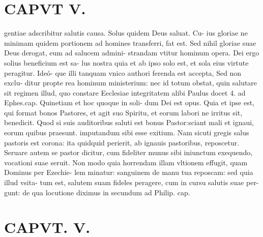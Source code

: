 \documentclass{article}
\begin{document}
\begin{pages}
\section*{CAPVT V. }
\marginpar{[ p.55 ]}\pstart gentiae adscribitur salutis causa. Solus quidem Deus saluat. Cu- ius gloriae ne minimam quidem portionem ad homines transferri, fat est. Sed nihil gloriae suae Deus derogat, eum ad salucem admini- strandam vtitur hominum opera. Dei ergo solius beneficium est sa- lus nostra quia et ab ipso solo est, et sola eius virtute peragitur. Ideó- que illi tanquam vnico authori ferenda est accepta, Sed non exclu- ditur propte rea hominum ministerium: nec id totum obstat, quin salutare sit regimen illud, quo constare Eeclesiae integritatem alibi Paulus docet 4. ad Ephes.cap. Quinetiam et hoc quoque in soli- dum Dei est opus. Quia et ipse est, qui format bonos Pastores, et agit suo Spiritu, et eorum labori ne irritus sit, benedicit. Quod si suis auditoribus saluti est bonus Pastor:sciant mali et ignaui, eorum quibus praesunt. imputandum sibi esse exitium. Nam sicuti gregis salus pastoris est corona: ita quidquid perierit, ab ignauis pastoribus, reposcetur. Seruare autem se pastor dicitur, cum fideliter munus sibi iniunctum exequendo, vocationi suae seruit. Non modo quia horrendam illam vltionem effugit, quam Dominus per Ezechie- lem minatur: sanguinem de manu tua reposcam: sed quia illud vsita- tum est, salutem suam fideles peragere, cum in cursu salutis suae per- gunt: de qua locutione diximus in secundum ad Philip. cap.  \pend
\endnumbering\beginnumbering\section{CAPVT. V.}
{}

\end{pages}
\end{document}
